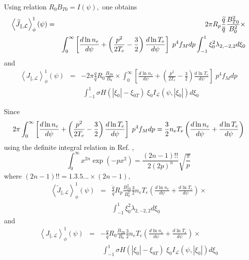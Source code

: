 Using relation $R_{0}B_{T0}=I\left( \psi \right) ,$ one obtains
\begin{eqnarray}
\left\langle \widetilde{J}_{\Vert ,\mathcal{L}}\right\rangle _{\phi
}^{1}\left( \psi \right)  &=&2\pi R_{p}\frac{\widetilde{q}}{\overline{q}}%
\frac{B_{T0}^{2}}{B_{0}^{2}}\times   \nonumber \\
&&\int_{0}^{\infty }\left[ \frac{d\ln n_{e}}{d\psi }+\left( \frac{p^{2}}{%
2T_{e}}-\frac{3}{2}\right) \frac{d\ln T_{e}}{d\psi }\right]
\;p^{4}f_{M}dp\int_{-1}^{1}\xi _{0}^{2}\lambda _{2,-2,2}d\xi
_{0}\nonumber
\\
\end{eqnarray}
and
\begin{eqnarray}
\left\langle J_{\Vert ,\mathcal{L}}\right\rangle _{\phi }^{1}\left( \psi
\right)  &=&-2\pi \frac{q}{\overline{q}}R_{0}\frac{B_{T0}}{B_{0}}\times
\int_{0}^{\infty }\left[ \frac{d\ln n_{e}}{d\psi }+\left( \frac{p^{2}}{2T_{e}%
}-\frac{3}{2}\right) \frac{d\ln T_{e}}{d\psi }\right] \;p^{4}f_{M}dp
\nonumber \\
&&\;\int_{-1}^{1}\sigma H\left( \left| \xi _{0}\right| -\xi _{0T}\right)
\;\xi _{0}I_{\mathcal{L}}\left( \psi ,\left| \xi _{0}\right| \right) d\xi
_{0}
\end{eqnarray}

Since
\begin{equation}
2\pi \int_{0}^{\infty }\left[ \frac{d\ln n_{e}}{d\psi }+\left( \frac{p^{2}}{
2T_{e}}-\frac{3}{2}\right) \frac{d\ln T_{e}}{d\psi }\right] \;p^{4}f_{M}dp=%
\frac{3}{2}n_{e}T_{e}\left( \frac{d\ln n_{e}}{d\psi }+\frac{d\ln T_{e}}{%
d\psi }\right)
\end{equation}
using the definite integral relation in Ref. \cite{aba70},
\begin{equation}
\int_{0}^{\infty }x^{2n}\exp \left( -px^{2}\right) =\frac{\left( 2n-1\right)
!!}{2\left( 2p\right) ^{n}}\sqrt{\frac{\pi }{p}}
\end{equation}
where $\left( 2n-1\right) !!=1.3.5...\times \left( 2n-1\right) ,$
\begin{eqnarray}
\left\langle \widetilde{J}_{\Vert ,\mathcal{L}}\right\rangle _{\phi
}^{1}\left( \psi \right)  &=&\frac{\widetilde{q}}{\overline{q}}R_{p}\frac{
B_{T0}^{2}}{B_{0}^{2}}\frac{3}{2}n_{e}T_{e}\left( \frac{d\ln n_{e}}{d\psi }+%
\frac{d\ln T_{e}}{d\psi }\right) \times   \nonumber \\
&&\int_{-1}^{1}\xi _{0}^{2}\lambda _{2,-2,2}d\xi _{0}
\end{eqnarray}
and
\begin{eqnarray}
\left\langle J_{\Vert ,\mathcal{L}}\right\rangle _{\phi }^{1}\left( \psi
\right)  &=&-\frac{q}{\overline{q}}R_{0}\frac{B_{T0}}{B_{0}}\frac{3}{2}
n_{e}T_{e}\left( \frac{d\ln n_{e}}{d\psi }+\frac{d\ln T_{e}}{d\psi }\right)
\times   \nonumber \\
&&\;\int_{-1}^{1}\sigma H\left( \left| \xi _{0}\right| -\xi _{0T}\right)
\;\xi _{0}I_{\mathcal{L}}\left( \psi ,\left| \xi _{0}\right| \right) d\xi
_{0}
\end{eqnarray}

